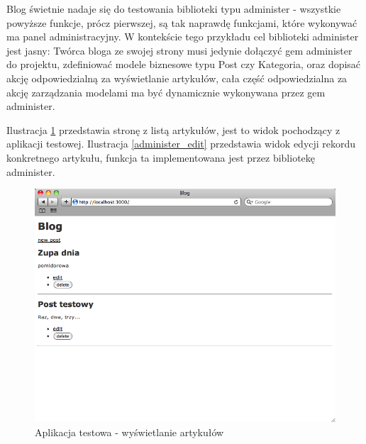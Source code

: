   Blog świetnie nadaje się do testowania biblioteki typu administer - wszystkie powyższe funkcje, prócz pierwszej, są tak naprawdę funkcjami, które wykonywać ma panel administracyjny. W kontekście tego przykładu cel biblioteki administer jest jasny: Twórca bloga ze swojej strony musi jedynie dołączyć gem administer do projektu, zdefiniować modele biznesowe typu Post czy Kategoria, oraz dopisać akcję odpowiedzialną za wyświetlanie artykułów, cała część odpowiedzialna za akcję zarządzania modelami ma być dynamicznie wykonywana przez gem administer. 
  
  Ilustracja \ref{blog_view} przedstawia stronę z listą artykułów, jest to widok pochodzący z aplikacji testowej. Ilustracja \ref{administer_edit} przedstawia widok edycji rekordu konkretnego artykułu, funkcja ta implementowana jest przez bibliotekę administer.
  
  \begin{figure}[!h]
		\begin{center}
			\includegraphics[width=\linewidth]{images/blog.png}
			\caption{Aplikacja testowa - wyświetlanie artykułów}
			\label{blog_view}
		\end{center}
	\end{figure}
	
	\clearpage
	
